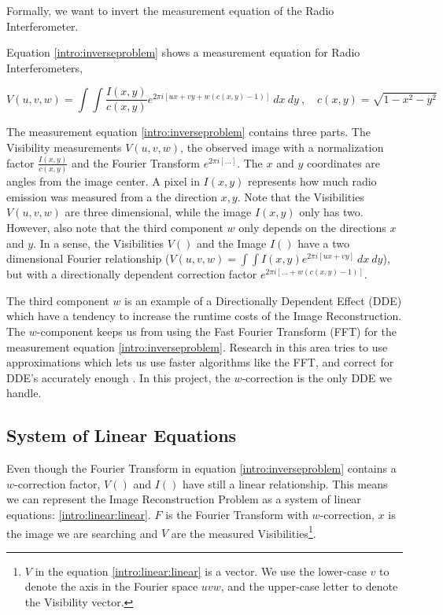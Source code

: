 Formally, we want to invert the measurement equation of the Radio Interferometer.

Equation \eqref{intro:inverseproblem} shows a measurement equation for Radio Interferometers, 


\begin{equation}\label{intro:inverseproblem}
V(u, v, w) = \int\int  \frac{I(x, y)}{c(x, y)}  e^{2 \pi i [ux+vy+ w(c(x, y) - 1)]} \: dx \: dy \:,  \quad c(x,y) = \sqrt{1 - x^2 - y ^2}
\end{equation}

The measurement equation \eqref{intro:inverseproblem} contains three parts. The Visibility measurements $V(u,v,w)$, the observed image with a normalization factor $\frac{I(x, y)}{c(x, y)}$ and the Fourier Transform $e^{2 \pi i [\ldots]}$. The $x$ and $y$ coordinates are angles from the image center. A pixel in $I(x,y)$ represents how much radio emission was measured from a the direction $x,y$. Note that the Visibilities $V(u,v,w)$ are three dimensional, while the image $I(x,y)$ only has two. However, also note that the third component $w$ only depends on the directions $x$ and $y$. In a sense, the Visibilities $V()$ and the Image $I()$ have a two dimensional Fourier relationship ($V(u,v,w) = \int\int I(x,y) e^{2 \pi i [ux+vy]} \: dx \: dy$), but with a directionally dependent correction factor $e^{2 \pi i [\ldots +w(c(x, y) - 1)]}$. 

The third component $w$ is an example of a Directionally Dependent Effect (DDE) which have a tendency to increase the runtime costs of the Image Reconstruction. The $w$-component keeps us from using the Fast Fourier Transform (FFT) for the measurement equation \eqref{intro:inverseproblem}. Research in this area tries to use approximations which lets us use faster algorithms like the FFT, and correct for DDE's accurately enough \cite{veenboer2017image, offringa2014wsclean, pratley2018fast}. In this project, the $w$-correction is the only DDE we handle.

\subsection{System of Linear Equations}\label{intro:linear}
Even though the Fourier Transform in equation \eqref{intro:inverseproblem} contains a $w$-correction factor, $V()$ and $I()$ have still a linear relationship. This means we can represent the Image Reconstruction Problem as a system of linear equations: \eqref{intro:linear:linear}. $F$ is the Fourier Transform with $w$-correction, $x$ is the image we are searching and $V$ are the measured Visibilities\footnote{$V$ in the equation \eqref{intro:linear:linear} is a vector. We use the lower-case $v$ to denote the axis in the Fourier space $uvw$, and the upper-case letter to denote the Visibility vector.}.

